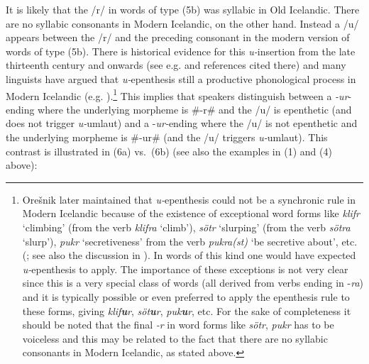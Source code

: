 \documentclass[output=paper,
modfonts
]{LSP/langsci}
\begin{document}
\noindent It is likely that the /r/ in words of type (5b) was syllabic in Old
Icelandic. There are no syllabic consonants in Modern Icelandic, on the
other hand. Instead a /u/ appears between the /r/ and the preceding
consonant in the modern version of words of type (5b). There is
historical evidence for this \emph{u-}insertion from the late
thirteenth century and onwards (see e.g. \citealt{kristinsson1992}
and references cited there) and many linguists have argued that
\emph{u-}epenthesis still a productive phonological process in Modern
Icelandic (e.g.  \citealt{anderson1969a,anderson1969b,oresnik1972,roegnvaldsson1981,kiparsky1984}).\footnote{Orešnik later  maintained that
  \emph{u-}epenthesis could not be a synchronic rule in Modern Icelandic
  because of the existence of exceptional word forms like \emph{klifr}
  `climbing' (from the verb \emph{klifra} `climb'), \emph{sötr}
  `slurping' (from the verb \emph{sötra} `slurp'), \emph{pukr}
  `secretiveness' from the verb \emph{pukra(st)} `be secretive about',
  etc. (\citealt{oresnik1978}; see also the discussion in \citealt{kjartansson1984}). In words of this
  kind one would have expected \emph{u-}epenthesis to apply. The
  importance of these exceptions is not very clear since this is a very
  special class of words (all derived from verbs ending in -\emph{ra})
  and it is typically possible or even preferred to apply the epenthesis
  rule to these forms, giving \emph{klif\textbf{u}r},
  \emph{söt\textbf{u}r}, \emph{puk\textbf{u}r}, etc. For the sake of
  completeness it should be noted that the final \emph{-r} in word forms
  like \emph{sötr}, \emph{pukr} has to be voiceless and this may be
  related to the fact that there are no syllabic consonants in Modern
  Icelandic, as stated above.} This implies that speakers distinguish
between a \emph{-ur}-ending where the underlying morpheme is \#-r\# and
the /u/ is epenthetic (and does not trigger \emph{u-}umlaut) and a
-\emph{ur-}ending where the /u/ is not epenthetic and the underlying
morpheme is \#-ur\# (and the /u/ triggers \emph{u-}umlaut). This
contrast is illustrated in (6a) vs.\ (6b) (see also the examples in (1)
and (4) above):
\end{document}

